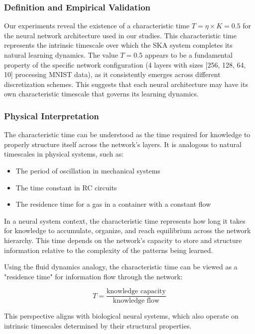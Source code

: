 \documentclass{article}
\begin{document}
\subsubsection{Definition and Empirical Validation}
Our experiments reveal the existence of a characteristic time $T = \eta \times K = 0.5$ for the neural network architecture used in our studies. This characteristic time represents the intrinsic timescale over which the SKA system completes its natural learning dynamics.
The value $T = 0.5$ appears to be a fundamental property of the specific network configuration (4 layers with sizes [256, 128, 64, 10] processing MNIST data), as it consistently emerges across different discretization schemes. This suggests that each neural architecture may have its own characteristic timescale that governs its learning dynamics.
	
	\subsubsection{Physical Interpretation}
	
	The characteristic time can be understood as the time required for knowledge to properly structure itself across the network's layers. It is analogous to natural timescales in physical systems, such as:
	
	\begin{itemize}
		\item The period of oscillation in mechanical systems
		\item The time constant in RC circuits
		\item The residence time for a gas in a container with a constant flow
	\end{itemize}
	
	In a neural system context, the characteristic time represents how long it takes for knowledge to accumulate, organize, and reach equilibrium across the network hierarchy. This time depends on the network's capacity to store and structure information relative to the complexity of the patterns being learned.
	
	Using the fluid dynamics analogy, the characteristic time can be viewed as a "residence time" for information flow through the network:
	
	\begin{equation}
		T = \frac{\text{knowledge capacity}}{\text{knowledge flow}}
	\end{equation}
	
	This perspective aligns with biological neural systems, which also operate on intrinsic timescales determined by their structural properties.
	
\end{document}

